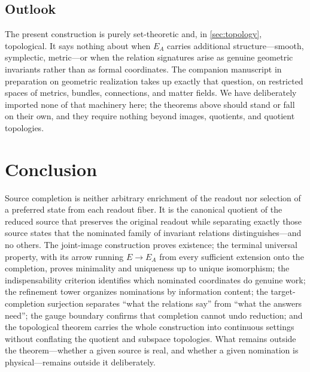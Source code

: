 \documentclass[11pt,reqno]{amsart}
\theoremstyle{plain}
\theoremstyle{definition}
\theoremstyle{remark}
\numberwithin{equation}{section}
\begin{document}
\subsection{Outlook}

The present construction is purely set-theoretic and, in \cref{sec:topology}, topological. It says
nothing about when $E_A$ carries additional structure---smooth, symplectic, metric---or when the
relation signatures arise as genuine geometric invariants rather than as formal coordinates. The
companion manuscript in preparation on geometric realization takes up exactly that question, on
restricted spaces of metrics, bundles, connections, and matter fields. We have deliberately imported
none of that machinery here; the theorems above should stand or fall on their own, and they require
nothing beyond images, quotients, and quotient topologies.

\section{Conclusion}
\label{sec:conclusion}

Source completion is neither arbitrary enrichment of the readout nor selection of a preferred state
from each readout fiber. It is the canonical quotient of the reduced source that preserves the
original readout while separating exactly those source states that the nominated family of invariant
relations distinguishes---and no others. The joint-image construction proves existence; the terminal
universal property, with its arrow running $E\to E_A$ from every sufficient extension onto the
completion, proves minimality and uniqueness up to unique isomorphism; the indispensability criterion
identifies which nominated coordinates do genuine work; the refinement tower organizes nominations by
information content; the target-completion surjection separates ``what the relations say'' from ``what
the answers need''; the gauge boundary confirms that completion cannot undo reduction; and the
topological theorem carries the whole construction into continuous settings without conflating the
quotient and subspace topologies. What remains outside the theorem---whether a given source is real,
and whether a given nomination is physical---remains outside it deliberately.
\end{document}
